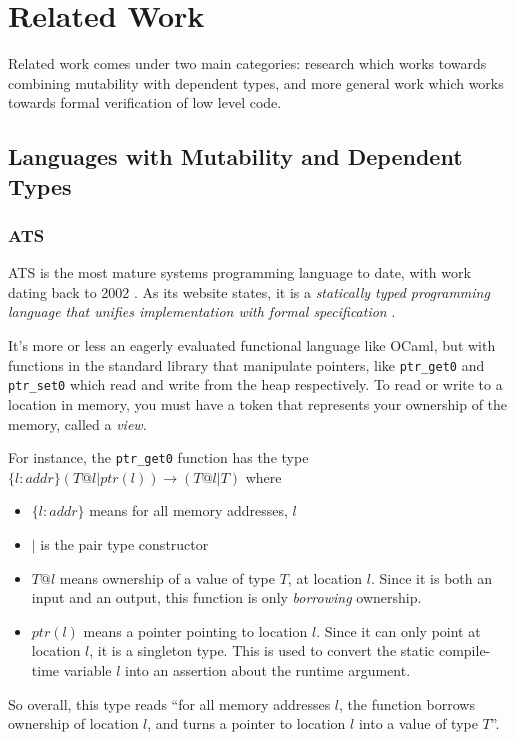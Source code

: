 \documentclass[12pt,twoside]{report}
\begin{document}
\section{Related Work}
Related work comes under two main categories: research which works towards combining mutability with dependent types, and more general work which works towards formal verification of low level code.

\subsection{Languages with Mutability and Dependent Types}

\subsubsection{ATS}
ATS \cite{xi_applied_2017} is the most mature systems programming language to date, with work dating back to 2002 \cite{ATSImplements}. As its website states, it is a \textit{statically typed programming language that unifies implementation with formal specification} \cite{ATSHome}.

It's more or less an eagerly evaluated functional language like OCaml, but with functions in the standard library that manipulate pointers, like \verb|ptr_get0| and \verb|ptr_set0| which read and write from the heap respectively. To read or write to a location in memory, you must have a token that represents your ownership of the memory, called a \textit{view}.

For instance, the \verb|ptr_get0| function has the type $\{l:addr\} (T @ l | ptr (l)) \rightarrow (T @ l | T)$ where
\begin{itemize}
  \item $\{l:addr\}$ means for all memory addresses, $l$
  \item $|$ is the pair type constructor
  \item $T @ l$ means ownership of a value of type $T$, at location $l$. Since it is both an input and an output, this function is only \textit{borrowing} ownership.
  \item $ptr(l)$ means a pointer pointing to location $l$. Since it can only point at location $l$, it is a singleton type. This is used to convert the static compile-time variable $l$ into an assertion about the runtime argument.
\end{itemize}


So overall, this type reads ``for all memory addresses $l$, the function borrows ownership of location $l$, and turns a pointer to location $l$ into a value of type $T$''.
\end{document}
